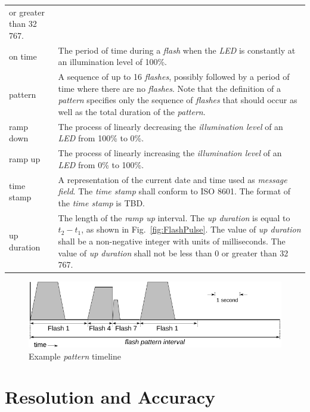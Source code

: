 \documentclass[letterpaper,11pt]{article}
\begin{document}
\begin{supertabular}{p{1.25in}p{5.25in}}
    or greater than 32\,767.\\
on time &
    The period of time during a \textit{flash} when the \textit{LED} is
    constantly at an illumination level of 100\%.\\
pattern &
    A sequence of up to 16 \textit{flashes}, possibly followed by a period
    of time where there are no \textit{flashes}.
    Note that the definition of a \textit{pattern} specifies only the sequence
    of \textit{flashes} that should occur as well as the total duration of the
    \textit{pattern}.\\
ramp down &
    The process of linearly decreasing the \textit{illumination level} of an
    \textit{LED} from 100\% to 0\%.\\
ramp up &
    The process of linearly increasing the \textit{illumination level} of an
    \textit{LED} from 0\% to 100\%.\\
time stamp &
    A representation of the current date and time used as \textit{message field}.
    The \textit{time stamp} shall conform to ISO 8601. The format of the
    \textit{time stamp} is TBD.\\
up duration &
    The length of the \textit{ramp up} interval. The \textit{up duration}
    is equal to $t_2 - t_1$, as shown in Fig.\ \ref{fig:FlashPulse}. The
    value of \textit{up duration} shall be a non-negative integer with units
    of milliseconds. The value of \textit{up duration} shall not be less than
    0 or greater than 32\,767.\\
\end{supertabular}

\begin{figure}[t]
  \begin{center}
    \includegraphics[scale=1.2]{Flashes_PatternTimeline2}
  \end{center}
  \vspace{-18pt}
  \caption{Example \textit{pattern} timeline}
  \label{fig:PatternTimeline}
\end{figure}

\section{Resolution and Accuracy}
\end{document}
